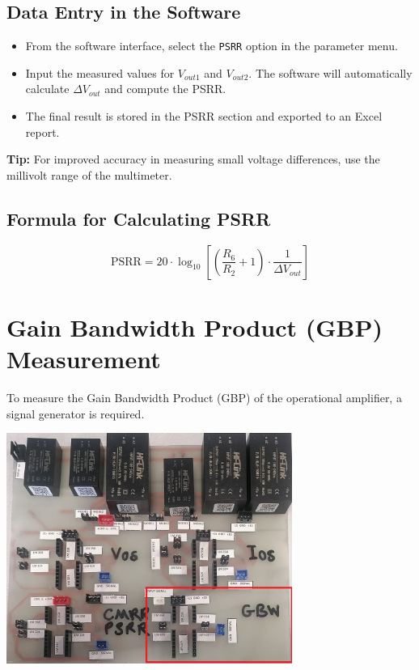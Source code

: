 \documentclass[a4paper,12pt]{article}
\begin{document}
\subsection*{Data Entry in the Software}

\begin{itemize}
  \item From the software interface, select the \texttt{PSRR} option in the parameter menu.
  \item Input the measured values for \( V_{out1} \) and \( V_{out2} \). The software will automatically calculate \( \Delta V_{out} \) and compute the PSRR.
  \item The final result is stored in the PSRR section and exported to an Excel report.
\end{itemize}

\textbf{Tip:} For improved accuracy in measuring small voltage differences, use the millivolt range of the multimeter.

\subsection*{Formula for Calculating PSRR}

\begin{equation}
\text{PSRR} = 20 \cdot \log_{10} \left[ \left( \frac{R_6}{R_2} + 1 \right) \cdot \frac{1}{\Delta V_{out}} \right]
\end{equation}

\clearpage
\section{Gain Bandwidth Product (GBP) Measurement}

To measure the Gain Bandwidth Product (GBP) of the operational amplifier, a signal generator is required.

\begin{center}
  \includegraphics[width=0.7\textwidth]{IMAGEs/gbp_test_circuit.png}
\end{center}
\end{document}
